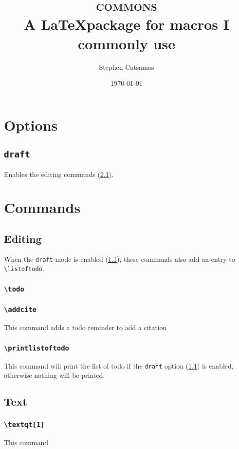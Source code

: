 \documentclass{article}
\title{\Huge\textsc{commons} \\\vspace*{1 em}
    \large A \LaTeX package for macros I commonly use}
\author{Stephen Catsamas}
\date{\today}
\begin{document}
\maketitle
\tableofcontents

\section{Options}
\subsection{\texttt{draft}}\label{sec:opt:draft}
    Enables the editing commands (\cref{sec:com:edit}).

\section{Commands}
\subsection{Editing}\label{sec:com:edit}
When the \texttt{draft} mode is enabled (\cref{sec:opt:draft}), these commands also add an entry to  \texttt{\textbackslash listoftodo}.
\subsubsection{\texttt{\textbackslash todo}}

\subsubsection{\texttt{\textbackslash addcite}}
    This command adds a todo reminder to add a citation \addcite{}

\subsubsection{\texttt{\textbackslash printlistoftodo}}
    This command will print the list of todo if the \texttt{draft} option (\cref{sec:opt:draft}) is enabled, otherwise nothing will be printed.

\subsection{Text}

\subsubsection{\texttt{\textbackslash textqt[1]}}
    This command 
\end{document}
